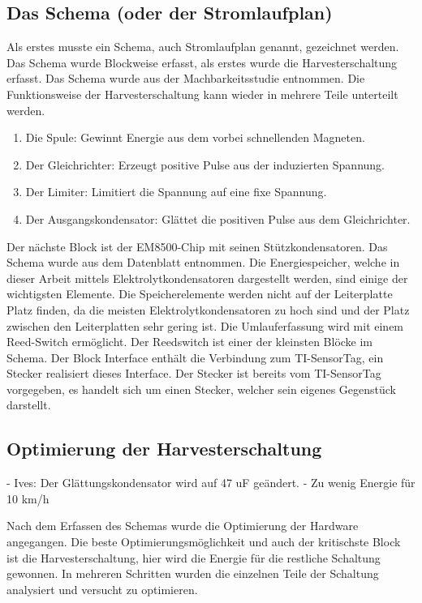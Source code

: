 \subsection{Das Schema (oder der Stromlaufplan)}
Als erstes musste ein Schema, auch Stromlaufplan genannt, gezeichnet werden. Das Schema wurde Blockweise erfasst, als erstes wurde die Harvesterschaltung erfasst. Das Schema wurde aus der Machbarkeitsstudie entnommen. Die Funktionsweise der Harvesterschaltung kann wieder in mehrere Teile unterteilt werden.

\begin{enumerate}
    \item Die Spule: Gewinnt Energie aus dem vorbei schnellenden Magneten.
    
    \item Der Gleichrichter: Erzeugt positive Pulse aus der induzierten Spannung.
    
    \item Der Limiter: Limitiert die Spannung auf eine fixe Spannung.
    
    \item Der Ausgangskondensator: Glättet die positiven Pulse aus dem Gleichrichter.
    
\end{enumerate}

Der nächste Block ist der EM8500-Chip mit seinen Stützkondensatoren. Das Schema wurde aus dem Datenblatt entnommen. 
Die Energiespeicher, welche in dieser Arbeit mittels Elektrolytkondensatoren dargestellt werden, sind einige der wichtigsten Elemente. Die Speicherelemente werden nicht auf der Leiterplatte Platz finden, da die meisten Elektrolytkondensatoren zu hoch sind und der Platz zwischen den Leiterplatten sehr gering ist. 
Die Umlauferfassung wird mit einem Reed-Switch ermöglicht. Der Reedswitch ist einer der kleinsten Blöcke im Schema.
Der Block Interface enthält die Verbindung zum TI-SensorTag, ein Stecker realisiert dieses Interface. Der Stecker ist bereits vom TI-SensorTag vorgegeben, es handelt sich um einen Stecker, welcher sein eigenes Gegenstück darstellt. 

\subsection{Optimierung der Harvesterschaltung}
- Ives: Der Glättungskondensator wird auf 47 uF geändert. 
- Zu wenig Energie für 10 km/h

Nach dem Erfassen des Schemas wurde die Optimierung der Hardware angegangen. Die beste Optimierungsmöglichkeit und auch der kritischste Block ist die Harvesterschaltung, hier wird die Energie für die restliche Schaltung gewonnen. In mehreren Schritten wurden die einzelnen Teile der Schaltung analysiert und versucht zu optimieren.


